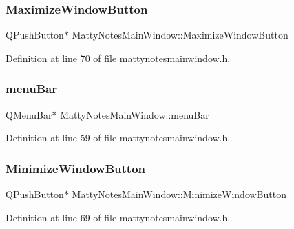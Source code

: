 \subsubsection{\texorpdfstring{Maximize\+Window\+Button}{MaximizeWindowButton}}
{\footnotesize\ttfamily Q\+Push\+Button$\ast$ Matty\+Notes\+Main\+Window\+::\+Maximize\+Window\+Button\hspace{0.3cm}{\ttfamily [private]}}



Definition at line 70 of file mattynotesmainwindow.\+h.

\hypertarget{classMattyNotesMainWindow_aad3423e267a86fc4e17cf1cc39a84173}{}\label{classMattyNotesMainWindow_aad3423e267a86fc4e17cf1cc39a84173} 
\subsubsection{\texorpdfstring{menu\+Bar}{menuBar}}
{\footnotesize\ttfamily Q\+Menu\+Bar$\ast$ Matty\+Notes\+Main\+Window\+::menu\+Bar\hspace{0.3cm}{\ttfamily [private]}}



Definition at line 59 of file mattynotesmainwindow.\+h.

\hypertarget{classMattyNotesMainWindow_aa56b544884c8e5bceccd0442ad5f32f1}{}\label{classMattyNotesMainWindow_aa56b544884c8e5bceccd0442ad5f32f1} 
\subsubsection{\texorpdfstring{Minimize\+Window\+Button}{MinimizeWindowButton}}
{\footnotesize\ttfamily Q\+Push\+Button$\ast$ Matty\+Notes\+Main\+Window\+::\+Minimize\+Window\+Button\hspace{0.3cm}{\ttfamily [private]}}



Definition at line 69 of file mattynotesmainwindow.\+h.

\hypertarget{classMattyNotesMainWindow_ad4910860415073b4d8c59190807800ba}{}\label{classMattyNotesMainWindow_ad4910860415073b4d8c59190807800ba} 
